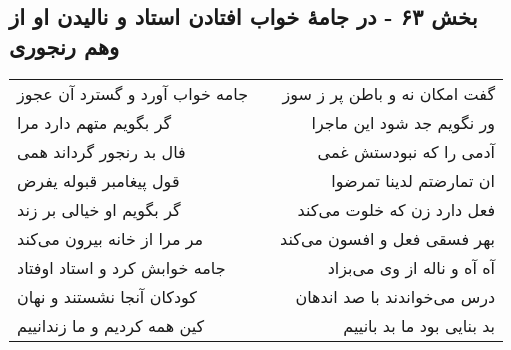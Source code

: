 \begin{center}
\section*{بخش ۶۳ - در جامهٔ خواب افتادن استاد و نالیدن او  از وهم رنجوری}
\label{sec:sh063}
\begin{longtable}{l p{0.5cm} r}
جامه خواب آورد و گسترد آن عجوز
&&
گفت امکان نه و باطن پر ز سوز
\\
گر بگویم متهم دارد مرا
&&
ور نگویم جد شود این ماجرا
\\
فال بد رنجور گرداند همی
&&
آدمی را که نبودستش غمی
\\
قول پیغامبر قبوله یفرض
&&
ان تمارضتم لدینا تمرضوا
\\
گر بگویم او خیالی بر زند
&&
فعل دارد زن که خلوت می‌کند
\\
مر مرا از خانه بیرون می‌کند
&&
بهر فسقی فعل و افسون می‌کند
\\
جامه خوابش کرد و استاد اوفتاد
&&
آه آه و ناله از وی می‌بزاد
\\
کودکان آنجا نشستند و نهان
&&
درس می‌خواندند با صد اندهان
\\
کین همه کردیم و ما زندانییم
&&
بد بنایی بود ما بد بانییم
\\
\end{longtable}
\end{center}
